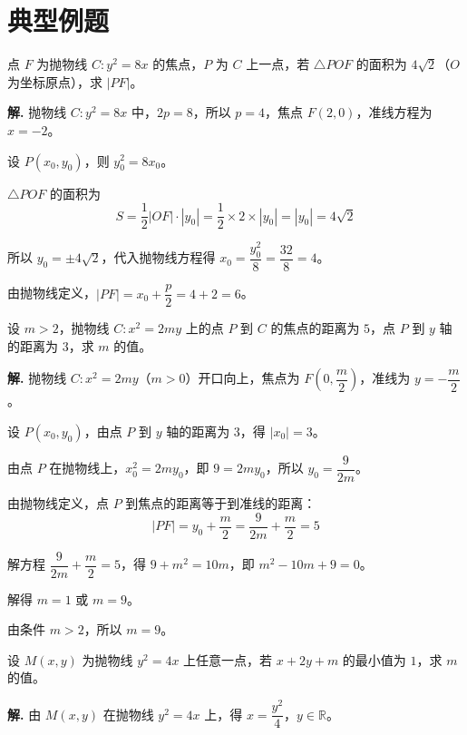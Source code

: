 \documentclass[11pt]{ctexrep}
\begin{document}
\section*{典型例题}

\begin{example}[抛物线的定义应用]
    点 $F$ 为抛物线 $C: y^2 = 8x$ 的焦点，$P$ 为 $C$ 上一点，若 $\triangle POF$ 的面积为 $4\sqrt{2}$（$O$ 为坐标原点），求 $|PF|$。
\end{example}

\textbf{解.} 抛物线 $C: y^2 = 8x$ 中，$2p = 8$，所以 $p = 4$，焦点 $F(2, 0)$，准线方程为 $x = -2$。

设 $P(x_0, y_0)$，则 $y_0^2 = 8x_0$。

$\triangle POF$ 的面积为
\[
    S = \frac{1}{2}|OF| \cdot |y_0| = \frac{1}{2} \times 2 \times |y_0| = |y_0| = 4\sqrt{2}
\]

所以 $y_0 = \pm 4\sqrt{2}$，代入抛物线方程得 $x_0 = \dfrac{y_0^2}{8} = \dfrac{32}{8} = 4$。

由抛物线定义，$|PF| = x_0 + \dfrac{p}{2} = 4 + 2 = 6$。

\begin{realexam}[2026届奉贤二模]
    设 $m > 2$，抛物线 $C: x^2 = 2my$ 上的点 $P$ 到 $C$ 的焦点的距离为 $5$，点 $P$ 到 $y$ 轴的距离为 $3$，求 $m$ 的值。
\end{realexam}

\textbf{解.} 抛物线 $C: x^2 = 2my$（$m > 0$）开口向上，焦点为 $F\left(0, \dfrac{m}{2}\right)$，准线为 $y = -\dfrac{m}{2}$。

设 $P(x_0, y_0)$，由点 $P$ 到 $y$ 轴的距离为 $3$，得 $|x_0| = 3$。

由点 $P$ 在抛物线上，$x_0^2 = 2my_0$，即 $9 = 2my_0$，所以 $y_0 = \dfrac{9}{2m}$。

由抛物线定义，点 $P$ 到焦点的距离等于到准线的距离：
\[
    |PF| = y_0 + \frac{m}{2} = \frac{9}{2m} + \frac{m}{2} = 5
\]

解方程 $\dfrac{9}{2m} + \dfrac{m}{2} = 5$，得 $9 + m^2 = 10m$，即 $m^2 - 10m + 9 = 0$。

解得 $m = 1$ 或 $m = 9$。

由条件 $m > 2$，所以 $m = 9$。

\begin{example}[抛物线的最值问题]
    设 $M(x, y)$ 为抛物线 $y^2 = 4x$ 上任意一点，若 $x + 2y + m$ 的最小值为 $1$，求 $m$ 的值。
\end{example}

\textbf{解.} 由 $M(x, y)$ 在抛物线 $y^2 = 4x$ 上，得 $x = \dfrac{y^2}{4}$，$y \in \mathbb{R}$。
\end{document}
